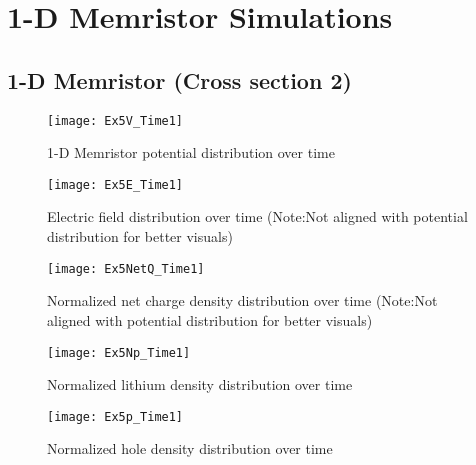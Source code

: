 
\chapter{1-D Memristor Simulations} %




\section{1-D Memristor (Cross section 2)}

\begin{landscape}
\begin{figure}[!htp]
\centering
\texttt{[image: Ex5V\_Time1]}
\caption{1-D Memristor potential distribution over time} 
\label{MemV}
\end{figure}
\end{landscape}


\begin{landscape}
\begin{figure}[!htp]
\centering
\texttt{[image: Ex5E\_Time1]}
\caption{Electric field distribution over time (Note:Not aligned with potential distribution for better visuals) } 
\label{MemE}
\end{figure}
\end{landscape}


\begin{landscape}
\begin{figure}[!htp]
\centering
\texttt{[image: Ex5NetQ\_Time1]}
\caption{Normalized net charge density distribution over time (Note:Not aligned with potential distribution for better visuals) } 
\label{}
\end{figure}
\end{landscape}


\begin{landscape}
\begin{figure}[!htp]
\centering
\texttt{[image: Ex5Np\_Time1]}
\caption{Normalized lithium density distribution over time} 
\label{}
\end{figure}
\end{landscape}


\begin{landscape}
\begin{figure}[!htp]
\centering
\texttt{[image: Ex5p\_Time1]}
\caption{Normalized hole density distribution over time} 
\label{}
\end{figure}
\end{landscape}

